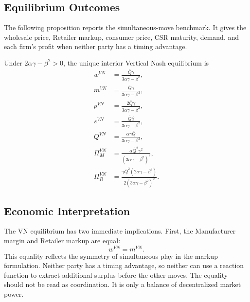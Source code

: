 \subsection{Equilibrium Outcomes}

The following proposition reports the simultaneous-move benchmark. It gives the wholesale price, Retailer markup, consumer price, CSR maturity, demand, and each firm's profit when neither party has a timing advantage.

\begin{proposition}
\label{prop:vn}
Under $2\alpha\gamma-\beta^2>0$, the unique interior Vertical Nash equilibrium is
\begin{align*}
    w^{VN} &= \frac{\bar{Q}\gamma}{3\alpha\gamma-\beta^2},\\
    m^{VN} &= \frac{\bar{Q}\gamma}{3\alpha\gamma-\beta^2},\\
    p^{VN} &= \frac{2\bar{Q}\gamma}{3\alpha\gamma-\beta^2},\\
    s^{VN} &= \frac{\bar{Q}\beta}{3\alpha\gamma-\beta^2},\\
    Q^{VN} &= \frac{\alpha\gamma\bar{Q}}{3\alpha\gamma-\beta^2},\\
    \Pi_M^{VN} &= \frac{\alpha\bar{Q}^2\gamma^2}{(3\alpha\gamma-\beta^2)^2},\\
    \Pi_R^{VN} &= \frac{\gamma\bar{Q}^2(2\alpha\gamma-\beta^2)}{2(3\alpha\gamma-\beta^2)^2}.
\end{align*}
\end{proposition}

\subsection{Economic Interpretation}

The VN equilibrium has two immediate implications. First, the Manufacturer margin and Retailer markup are equal:
\begin{equation*}
    w^{VN}=m^{VN}.
\end{equation*}
This equality reflects the symmetry of simultaneous play in the markup formulation. Neither party has a timing advantage, so neither can use a reaction function to extract additional surplus before the other moves. The equality should not be read as coordination. It is only a balance of decentralized market power.

